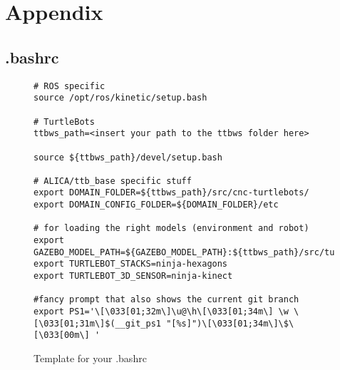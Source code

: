\appendix
\chapter{Appendix}
\label{chap:Appendix}

\begin{landscape}
  \section{.bashrc}
  \label{sec:bashrc}
  \begin{figure}[htbp]
    \begin{verbatim}
# ROS specific 
source /opt/ros/kinetic/setup.bash

# TurtleBots
ttbws_path=<insert your path to the ttbws folder here>

source ${ttbws_path}/devel/setup.bash

# ALICA/ttb_base specific stuff
export DOMAIN_FOLDER=${ttbws_path}/src/cnc-turtlebots/
export DOMAIN_CONFIG_FOLDER=${DOMAIN_FOLDER}/etc

# for loading the right models (environment and robot)
export GAZEBO_MODEL_PATH=${GAZEBO_MODEL_PATH}:${ttbws_path}/src/turtlebot/turtlebot_bringup/models
export TURTLEBOT_STACKS=ninja-hexagons
export TURTLEBOT_3D_SENSOR=ninja-kinect

#fancy prompt that also shows the current git branch
export PS1='\[\033[01;32m\]\u@\h\[\033[01;34m\] \w \[\033[01;31m\]$(__git_ps1 "[%s]")\[\033[01;34m\]\$\[\033[00m\] '
    \end{verbatim}
    \caption{Template for your .bashrc}
    \label{fig:template_bashrc}
  \end{figure}
\end{landscape}